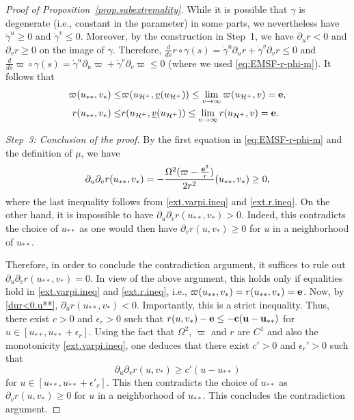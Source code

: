 \documentclass[10pt, reqno]{amsart}
\theoremstyle{definition}
\theoremstyle{remark}
\numberwithin{equation}{section}
\newcommand{\ep}{\epsilon}
\newcommand{\ud}{d}
\newcommand{\rd}{\partial}
\newcommand{\0}{\emptyset}
\newcommand{\gmm}{\gamma}
\newcommand{\Omg}{\Omega}
\newcommand{\bfe}{{\bf e}}
\newcommand{\calH}{\mathcal H}
\newcommand{\EH}{\calH^{+}}
\newcommand{\pfstep}[1]{\vspace{.5em} {\it \noindent #1.}}
\newcommand{\e}{\bfe}							%
\begin{document}
\begin{proof}[Proof of Proposition~\ref{prop.subextremality}]
While it is possible that $\gmm$ is degenerate (i.e., constant in the parameter) in some parts, we nevertheless have $\dot{\gmm}^{u} \geq 0$ and $\dot{\gmm}^{v} \leq 0$. Moreover, by the construction in Step~1, we have $\rd_{u} r < 0$ and $\rd_{v} r \geq 0$ on the image of $\gmm$. Therefore, $\frac{\ud}{\ud s} r \circ \gmm(s) = \dot{\gmm}^{u} \rd_{u} r + \dot{\gmm}^{v} \rd_{v} r \leq 0$ and $\frac{\ud}{\ud s} \varpi \circ \gmm(s) = \dot{\gmm}^{u} \rd_{u} \varpi + \dot{\gmm}^{v} \rd_{v} \varpi \leq 0$ (where we used \eqref{eq:EMSF-r-phi-m}). It follows that
\begin{align} 
\varpi(u_{**}, v_*)\leq & \varpi(u_{\EH}, \underline{v}(u_{\EH}))\leq  \lim_{v\to \infty} \varpi(u_{\EH}, v)= \e,  \label{ext.varpi.ineq} \\
r(u_{**}, v_*)\leq & r(u_{\EH}, \underline{v}(u_{\EH})) \leq \lim_{v\to \infty} r(u_{\EH}, v) = \e. \label{ext.r.ineq}
\end{align}


\pfstep{Step~3: Conclusion of the proof}
By the first equation in \eqref{eq:EMSF-r-phi-m} and the definition of $\mu$, we have
\begin{equation}\label{ext.r.wave.ineq}
\rd_{u} \rd_{v} r (u_{**}, v_*)= -\frac{\Omg^2 (\varpi - \frac{\e^{2}}{r})}{2 r^{2}}(u_{**}, v_*)\geq 0,
\end{equation}
where the last inequality follows from \eqref{ext.varpi.ineq} and \eqref{ext.r.ineq}.
On the other hand, it is impossible to have $\rd_{u} \rd_v r (u_{**}, v_*)> 0$. Indeed, this contradicts the choice of $u_{**}$ as one would then have $\rd_v r (u, v_*)\geq 0$ for $u$ in a neighborhood of $u_{**}$.

Therefore, in order to conclude the contradiction argument, it suffices to rule out $\rd_{u} \rd_v r (u_{**}, v_*)= 0$. In view of the above argument, this holds only if equalities hold in \eqref{ext.varpi.ineq} and \eqref{ext.r.ineq}, i.e., $\varpi(u_{**}, v_*)=r(u_{**}, v_*)=\bf e$. Now, by \eqref{dur<0.u**}, $\rd_u r(u_{**}, v_*)<0$. Importantly, this is a strict inequality. Thus, there exist $c>0$ and $\ep_r>0$ such that $r(u,v_*)-\bf e\leq -c(u-u_{**})$ for $u\in [u_{**}, u_{**}+\ep_r]$. Using the fact that $\Omg^2$, $\varpi$ and $r$ are $C^1$ and also the monotonicity \eqref{ext.varpi.ineq}, one deduces that there exist $c'>0$ and $\ep_r'>0$ such that
$$\rd_{u} \rd_v r (u, v_*)\geq c'(u-u_{**})$$
for $u\in [u_{**}, u_{**}+\ep'_r]$. This then contradicts the choice of $u_{**}$ as $\rd_v r (u, v_*)\geq 0$ for $u$ in a neighborhood of $u_{**}$. This concludes the contradiction argument.
\end{proof}
\end{document}
